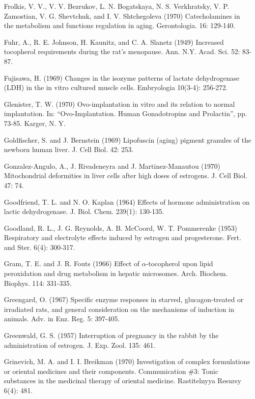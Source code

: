 Frolkis, V. V., V. V. Bezrukov, L. N. Bogatskaya, N. S. Verkhratsky, V. P. Zamostian, V. G. Shevtchuk, and I. V. Shtchegoleva (1970) Catecholamines in the metabolism and functions regulation in aging. Gerontologia. 16: 129-140.

Fuhr, A., R. E. Johnson, H. Kaunitz, and C. A. Slanetz (1949) Increased tocopherol requirements during the rat's menopause. Ann. N.Y. Acad. Sci. 52: 83-87.

Fujisawa, H. (1969) Changes in the isozyme patterns of lactate dehydrogenase (LDH) in the in vitro cultured muscle cells. Embryologia 10(3-4): 256-272.


Glenister, T. W. (1970) Ovo-implantation in vitro and its relation to normal implantation. In: ``Ovo-Implantation. Human Gonadotropins and Prolactin'', pp. 73-85. Karger, N. Y.

Goldfischer, S. and J. Bernstein (1969) Lipofuscin (aging) pigment granules of the newborn human liver. J. Cell Biol. 42: 253.

Gonzalez-Angulo, A., J. Rivadeneyra and J. Martinez-Manautou (1970) Mitochondrial deformities in liver cells after high doses of estrogens. J. Cell Biol. 47: 74.

Goodfriend, T. L. and N. O. Kaplan (1964) Effects of hormone administration on lactic dehydrogenase. J. Biol. Chem. 239(1): 130-135.

Goodland, R. L., J. G. Reynolds, A. B. McCoord, W. T. Pommerenke (1953) Respiratory and electrolyte effects induced by estrogen and progesterone. Fert. and Ster. 6(4): 300-317.

Gram, T. E. and J. R. Fouts (1966) Effect of $\alpha$-tocopherol upon lipid peroxidation and drug metabolism in hepatic microsomes. Arch. Biochem. Biophys. 114: 331-335.

Greengard, O. (1967) Specific enzyme responses in starved, glucagon-treated or irradiated rats, and general consideration on the mechanisms of induction in animals. Adv. in Enz. Reg. 5: 397-405.

Greenwald, G. S. (1957) Interruption of pregnancy in the rabbit by the administration of estrogen. J. Exp. Zool. 135: 461.

Grinevich, M. A. and I. I. Breikman (1970) Investigation of complex formulations or oriental medicines and their components. Communication \#3: Tonic substances in the medicinal therapy of oriental medicine. Rastitelnyya Resursy 6(4): 481.

